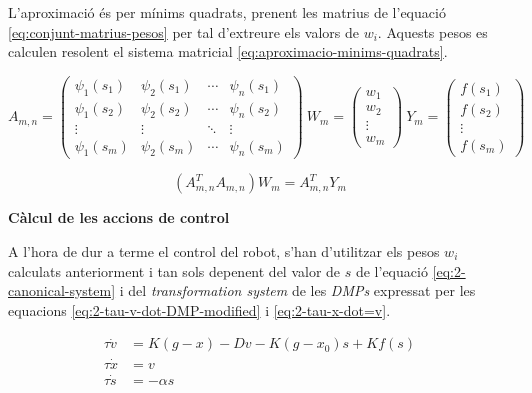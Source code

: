 \documentclass[12pt,a4paper,final,twoside]{article}
\begin{document}
L'aproximació és per mínims quadrats, prenent les matrius de l'equació \eqref{eq:conjunt-matrius-pesos} per tal d'extreure els valors de $w_i$. Aquests pesos es calculen resolent el sistema matricial \eqref{eq:aproximacio-minims-quadrats}.

\begin{equation}
A_{m,n} = \begin{pmatrix}
  \psi_1(s_1) & \psi_2(s_1) & \cdots & \psi_n(s_1) \\
  \psi_1(s_2) & \psi_2(s_2) & \cdots & \psi_n(s_2) \\
  \vdots  & \vdots  & \ddots & \vdots  \\
  \psi_1(s_m) & \psi_2(s_m) & \cdots & \psi_n(s_m)
\end{pmatrix}
~
W_m = \begin{pmatrix}
  w_1\\
  w_2\\
  \vdots \\
  w_m
\end{pmatrix}
~
Y_m = \begin{pmatrix}
  f(s_1)\\
  f(s_2)\\
  \vdots \\
  f(s_m)
\end{pmatrix}
\label{eq:conjunt-matrius-pesos}
\end{equation}

\begin{equation}
(A_{m,n}^T A_{m,n}) W_m = A_{m,n}^T Y_m
\label{eq:aproximacio-minims-quadrats}
\end{equation}

\vspace{20pt}
\textbf{Càlcul de les accions de control}

A l'hora de dur a terme el control del robot, s'han d'utilitzar els pesos $w_i$ calculats anteriorment i tan sols depenent del valor de $s$ de l'equació \eqref{eq:2-canonical-system} i del \textit{transformation system} de les \textit{DMPs} expressat per les equacions \eqref{eq:2-tau-v-dot-DMP-modified} i \eqref{eq:2-tau-x-dot=v}.

\begin{align}
\tau \dot{v} &= K(g - x) - Dv - K(g - x_0)s + K f(s)\label{eq:2-tau-v-dot-DMP-modified}\\
\tau \dot{x} &= v\label{eq:2-tau-x-dot=v}\\
\tau \dot{s} &= - \alpha s \label{eq:2-canonical-system}
\end{align}
\end{document}
